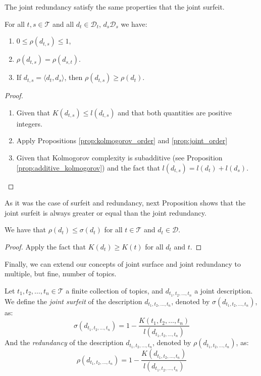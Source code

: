 The joint redundancy satisfy the same properties that the joint surfeit.

\begin{proposition}

For all $t, s \in \mathcal{T}$ and all $d_t \in \mathcal{D}_t$, $d_s \mathcal{D}_s$ we have:

\renewcommand{\theenumi}{\roman{enumi}}
\begin{enumerate}
\item $0 \leq \rho(d_{t,s}) \leq 1$,
\item $\rho(d_{t,s}) = \rho(d_{s,t})$.
\item If $d_{t,s} = \langle d_t, d_s \rangle$, then $\rho(d_{t,s}) \geq \rho(d_t)$.
\end{enumerate}
\end{proposition}
\begin{proof}

\renewcommand{\theenumi}{\roman{enumi}}
\begin{enumerate}

\item Given that $K(d_{t,s}) \leq l(d_{t,s})$ and that both quantities are positive integers.

\item Apply Propositions \ref{prop:kolmogorov_order} and \ref{prop:joint_order}

\item Given that Kolmogorov complexity is subadditive (see Proposition \ref{prop:additive_kolmogorov}) and the fact that $l(d_{t,s}) = l(d_t) + l(d_s)$.

\end{enumerate}
\end{proof}

As it was the case of surfeit and redundancy, next Proposition shows that the joint surfeit is always greater or equal than the joint redundancy.

\begin{proposition}
We have that $\rho(d_t) \leq \sigma(d_t)$ for all $t \in \mathcal{T}$ and $d_t \in \mathcal{D}$.
\end{proposition}
\begin{proof}
Apply the fact that $K(d_t) \geq K(t)$ for all $d_t$ and $t$.
\end{proof}

Finally, we can extend our concepts of joint surface and joint redundancy to multiple, but fine, number of topics.

\begin{definition}
Let $t_1, t_2, \ldots, t_n \in \mathcal{T}$ a finite collection of topics, and $d_{t_1, t_2, \ldots, t_n}$ a joint description. We define the \emph{joint surfeit} of the description $d_{t_1, t_2, \ldots, t_n}$, denoted by $\sigma(d_{t_1, t_2, \ldots, t_n})$, as: 
\[
\sigma(d_{t_1, t_2, \ldots, t_n}) = 1 - \frac{K(t_1, t_2, \ldots, t_n)}{l \left( d_{t_1, t_2, \ldots, t_n} \right)}
\]
And the \emph{redundancy} of the description $d_{t_1, t_2, \ldots, t_n}$, denoted by $\rho(d_{t_1, t_2, \ldots, t_n})$, as:
\[
\rho(d_{t_1, t_2, \ldots, t_n}) = 1 - \frac{K(d_{t_1, t_2, \ldots, t_n})}{l \left( d_{t_1, t_2, \ldots, t_n} \right)}
\]
\end{definition}

